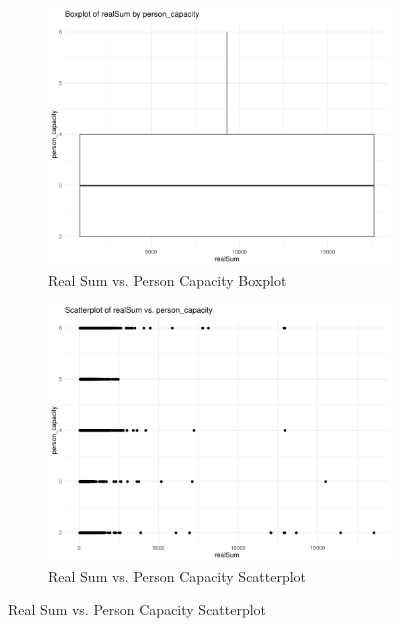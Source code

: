 \documentclass[12pt, letterpaper]{article}
\begin{document}
\begin{figure}[H]
  \vspace{0.05\textwidth}

  \begin{subfigure}{0.45\textwidth}
    \includegraphics[width=\linewidth]{realSum_person_capacity__boxplot.pdf}
    \caption{Real Sum vs. Person Capacity Boxplot}
    \label{fig:realSum_person_capacity__boxplot}
  \end{subfigure}
  \hspace{0.05\textwidth}
  \begin{subfigure}{0.45\textwidth}
    \includegraphics[width=\linewidth]{realSum_person_capacity__scatterplot.pdf}
    \caption{Real Sum vs. Person Capacity Scatterplot}
    \label{fig:realSum_person_capacity__scatterplot}
  \end{subfigure}

  \vspace{0.05\textwidth}
\end{figure}
\end{document}
